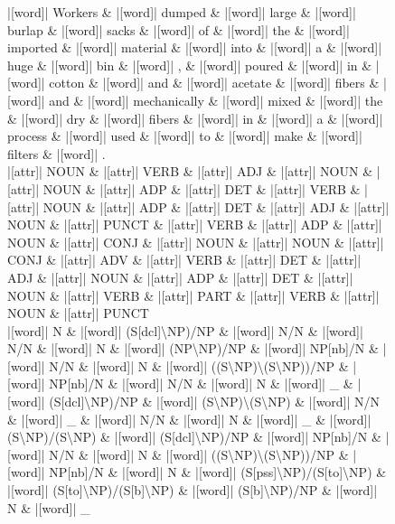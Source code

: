 \documentclass[10pt,a4paper]{article}
\begin{document}
\begin{figure}[h]
{\begin{dependency}[theme = simple]
\begin{deptext}[column sep=1em, row sep=0.1em]
|[word]| Workers \& |[word]| dumped \& |[word]| large \& |[word]| burlap \& |[word]| sacks \& |[word]| of \& |[word]| the \& |[word]| imported \& |[word]| material \& |[word]| into \& |[word]| a \& |[word]| huge \& |[word]| bin \& |[word]| , \& |[word]| poured \& |[word]| in \& |[word]| cotton \& |[word]| and \& |[word]| acetate \& |[word]| fibers \& |[word]| and \& |[word]| mechanically \& |[word]| mixed \& |[word]| the \& |[word]| dry \& |[word]| fibers \& |[word]| in \& |[word]| a \& |[word]| process \& |[word]| used \& |[word]| to \& |[word]| make \& |[word]| filters \& |[word]| . \\
|[attr]| NOUN \& |[attr]| VERB \& |[attr]| ADJ \& |[attr]| NOUN \& |[attr]| NOUN \& |[attr]| ADP \& |[attr]| DET \& |[attr]| VERB \& |[attr]| NOUN \& |[attr]| ADP \& |[attr]| DET \& |[attr]| ADJ \& |[attr]| NOUN \& |[attr]| PUNCT \& |[attr]| VERB \& |[attr]| ADP \& |[attr]| NOUN \& |[attr]| CONJ \& |[attr]| NOUN \& |[attr]| NOUN \& |[attr]| CONJ \& |[attr]| ADV \& |[attr]| VERB \& |[attr]| DET \& |[attr]| ADJ \& |[attr]| NOUN \& |[attr]| ADP \& |[attr]| DET \& |[attr]| NOUN \& |[attr]| VERB \& |[attr]| PART \& |[attr]| VERB \& |[attr]| NOUN \& |[attr]| PUNCT \\
|[word]| N \& |[word]| (S{[}dcl{]}\textbackslash{}NP)/NP \& |[word]| N/N \& |[word]| N/N \& |[word]| N \& |[word]| (NP\textbackslash{}NP)/NP \& |[word]| NP{[}nb{]}/N \& |[word]| N/N \& |[word]| N \& |[word]| ((S\textbackslash{}NP)\textbackslash{}(S\textbackslash{}NP))/NP \& |[word]| NP{[}nb{]}/N \& |[word]| N/N \& |[word]| N \& |[word]| \_ \& |[word]| (S{[}dcl{]}\textbackslash{}NP)/NP \& |[word]| (S\textbackslash{}NP)\textbackslash{}(S\textbackslash{}NP) \& |[word]| N/N \& |[word]| \_ \& |[word]| N/N \& |[word]| N \& |[word]| \_ \& |[word]| (S\textbackslash{}NP)/(S\textbackslash{}NP) \& |[word]| (S{[}dcl{]}\textbackslash{}NP)/NP \& |[word]| NP{[}nb{]}/N \& |[word]| N/N \& |[word]| N \& |[word]| ((S\textbackslash{}NP)\textbackslash{}(S\textbackslash{}NP))/NP \& |[word]| NP{[}nb{]}/N \& |[word]| N \& |[word]| (S{[}pss{]}\textbackslash{}NP)/(S{[}to{]}\textbackslash{}NP) \& |[word]| (S{[}to{]}\textbackslash{}NP)/(S{[}b{]}\textbackslash{}NP) \& |[word]| (S{[}b{]}\textbackslash{}NP)/NP \& |[word]| N \& |[word]| \_ \\
\end{deptext}



\end{dependency}}
\end{figure}
\end{document}
